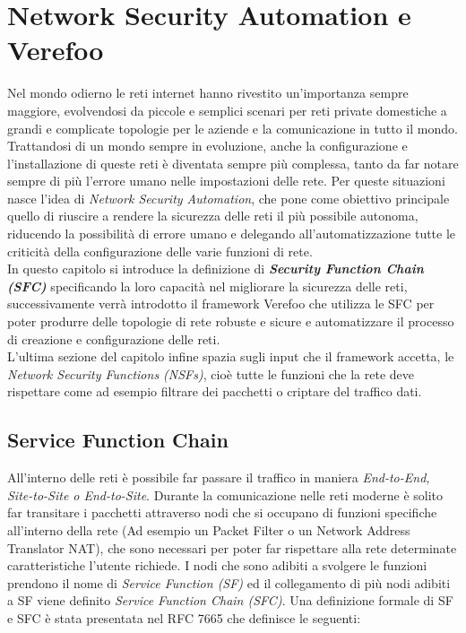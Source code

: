 

\chapter{Network Security Automation e Verefoo} \label{ch:verefoo}




Nel mondo odierno le reti internet hanno rivestito un'importanza sempre maggiore, evolvendosi da piccole e semplici scenari per reti private domestiche
a grandi e complicate topologie per le aziende e la comunicazione in tutto il mondo. Trattandosi di un mondo sempre in evoluzione, anche la configurazione e
l'installazione di queste reti è diventata sempre più complessa, tanto da far notare sempre di più l'errore umano nelle impostazioni delle rete.
Per queste situazioni nasce l'idea di \textit{Network Security Automation}, che pone come obiettivo principale quello di riuscire a rendere la sicurezza delle reti
il più possibile autonoma, riducendo la possibilità di errore umano e delegando all'automatizzazione tutte le criticità della configurazione delle varie funzioni di rete.\\
In questo capitolo si introduce la definizione di \textbf{\textit{Security Function Chain (SFC)}} specificando la loro capacità nel migliorare la sicurezza delle reti,
successivamente verrà introdotto il framework Verefoo che utilizza le SFC per poter produrre delle topologie di rete robuste e sicure e automatizzare il processo di creazione e configurazione delle reti.\\
L'ultima sezione del capitolo infine spazia sugli input che il framework accetta, le \textit{Network Security Functions (NSFs)}, cioè tutte le funzioni che la rete deve rispettare come ad esempio filtrare dei pacchetti
o criptare del traffico dati. 


\section{Service Function Chain} 

All'interno delle reti è possibile far passare il traffico in maniera \textit{End-to-End, Site-to-Site o End-to-Site}.
Durante la comunicazione nelle reti moderne è solito far transitare i pacchetti attraverso nodi che si occupano di funzioni specifiche all'interno della
rete (Ad esempio un Packet Filter o un Network Address Translator NAT), che sono necessari per poter far rispettare alla rete determinate caratteristiche l'utente richiede.
I nodi che sono adibiti a svolgere le funzioni prendono il nome di \textit{Service Function (SF)} ed il collegamento di più nodi adibiti a SF viene definito 
\textit{Service Function Chain (SFC)}. Una definizione formale di SF e SFC è stata presentata nel RFC 7665 \cite{rfc7665} 
che definisce le seguenti:

